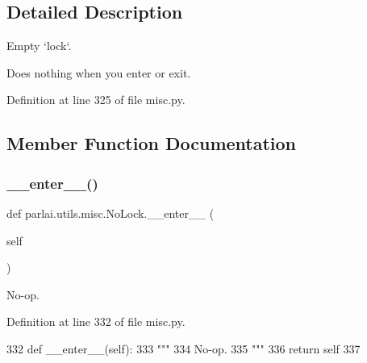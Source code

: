 \subsection{Detailed Description}
\begin{DoxyVerb}Empty `lock`.

Does nothing when you enter or exit.
\end{DoxyVerb}
 

Definition at line 325 of file misc.\+py.



\subsection{Member Function Documentation}
\mbox{\label{classparlai_1_1utils_1_1misc_1_1NoLock_a8b86612989f12c74a104aedfb85d41ef}} 
\subsubsection{\texorpdfstring{\+\_\+\+\_\+enter\+\_\+\+\_\+()}{\_\_enter\_\_()}}
{\footnotesize\ttfamily def parlai.\+utils.\+misc.\+No\+Lock.\+\_\+\+\_\+enter\+\_\+\+\_\+ (\begin{DoxyParamCaption}\item[{}]{self }\end{DoxyParamCaption})}

\begin{DoxyVerb}No-op.
\end{DoxyVerb}
 

Definition at line 332 of file misc.\+py.


\begin{DoxyCode}
332     \textcolor{keyword}{def }\_\_enter\_\_(self):
333         \textcolor{stringliteral}{"""}
334 \textcolor{stringliteral}{        No-op.}
335 \textcolor{stringliteral}{        """}
336         \textcolor{keywordflow}{return} self
337 
\end{DoxyCode}
\mbox{\label{classparlai_1_1utils_1_1misc_1_1NoLock_a4f7170fad1283a391068f0b403734502}} 
